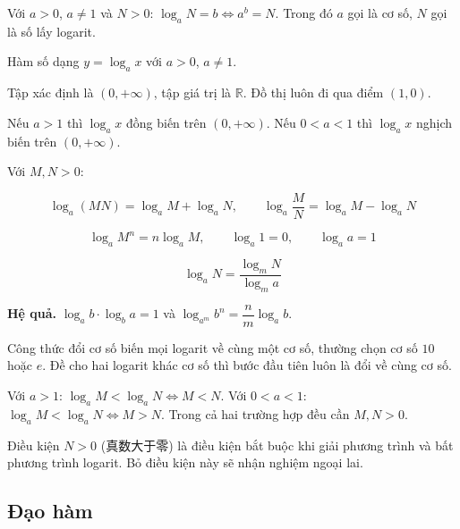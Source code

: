 \documentclass[11pt, a4paper]{article}
\begin{document}
\begin{dinhnghia}[{3 — Logarit}]
Với $a > 0$, $a \neq 1$ và $N > 0$: $\log_a N = b \iff a^b = N$. Trong đó $a$ gọi là cơ số, $N$ gọi là số lấy logarit.
\end{dinhnghia}
\begin{dinhnghia}
Hàm số dạng $y = \log_a x$ với $a > 0$, $a \neq 1$.
\end{dinhnghia}
\begin{dinhly}
Tập xác định là $(0, +\infty)$, tập giá trị là $\mathbb{R}$. Đồ thị luôn đi qua điểm $(1, 0)$.
\end{dinhly}
\begin{dinhly}
Nếu $a > 1$ thì $\log_a x$ đồng biến trên $(0, +\infty)$. Nếu $0 < a < 1$ thì $\log_a x$ nghịch biến trên $(0, +\infty)$.
\end{dinhly}
\begin{dinhly}
Với $M, N > 0$:

$$\log_a(MN) = \log_a M + \log_a N, \qquad \log_a \frac{M}{N} = \log_a M - \log_a N$$

$$\log_a M^n = n \log_a M, \qquad \log_a 1 = 0, \qquad \log_a a = 1$$
\end{dinhly}
\begin{dinhly}
$$\log_a N = \frac{\log_m N}{\log_m a}$$

\textbf{Hệ quả.} $\log_a b \cdot \log_b a = 1$ và $\log_{a^m} b^n = \dfrac{n}{m}\log_a b$.

 Công thức đổi cơ số biến mọi logarit về cùng một cơ số, thường chọn cơ số $10$ hoặc $e$. Đề cho hai logarit khác cơ số thì bước đầu tiên luôn là đổi về cùng cơ số.
\end{dinhly}
\begin{dinhly}
Với $a > 1$: $\log_a M < \log_a N \iff M < N$. Với $0 < a < 1$: $\log_a M < \log_a N \iff M > N$. Trong cả hai trường hợp đều cần $M, N > 0$.

 Điều kiện $N > 0$ (真数大于零) là điều kiện bắt buộc khi giải phương trình và bất phương trình logarit. Bỏ điều kiện này sẽ nhận nghiệm ngoại lai.
\end{dinhly}
\subsection{Đạo hàm}
\end{document}

